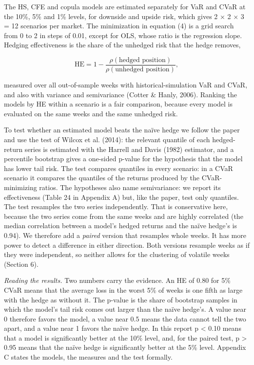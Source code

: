\documentclass[11pt,letterpaper]{article}
\begin{document}
The HS, CFE and copula models are estimated separately for VaR and CVaR at the 10\%, 5\% and 1\% levels, for downside and upside risk, which gives 2 × 2 × 3 = 12 scenarios per market. The minimization in equation (4) is a grid search from 0 to 2 in steps of 0.01, except for OLS, whose ratio is the regression slope. Hedging effectiveness is the share of the unhedged risk that the hedge removes,

\begin{equation}
\mathrm{HE} = 1 - \frac{\rho(\text{hedged position})}{\rho(\text{unhedged position})},
\end{equation}

measured over all out-of-sample weeks with historical-simulation VaR and CVaR, and also with variance and semivariance (Cotter \& Hanly, 2006). Ranking the models by HE within a scenario is a fair comparison, because every model is evaluated on the same weeks and the same unhedged risk.

To test whether an estimated model beats the naïve hedge we follow the paper and use the test of Wilcox et al. (2014): the relevant quantile of each hedged-return series is estimated with the Harrell and Davis (1982) estimator, and a percentile bootstrap gives a one-sided p-value for the hypothesis that the model has lower tail risk. The test compares quantiles in every scenario: in a CVaR scenario it compares the quantiles of the returns produced by the CVaR-minimizing ratios. The hypotheses also name semivariance: we report its effectiveness (Table 24 in Appendix A) but, like the paper, test only quantiles. The test resamples the two series independently. That is conservative here, because the two series come from the same weeks and are highly correlated (the median correlation between a model's hedged returns and the naïve hedge's is 0.94). We therefore add a \textit{paired} version that resamples whole weeks. It has more power to detect a difference in either direction. Both versions resample weeks as if they were independent, so neither allows for the clustering of volatile weeks (Section 6).

\textit{Reading the results.} Two numbers carry the evidence. An HE of 0.80 for 5\% CVaR means that the average loss in the worst 5\% of weeks is one fifth as large with the hedge as without it. The p-value is the share of bootstrap samples in which the model's tail risk comes out larger than the naïve hedge's. A value near 0 therefore favors the model, a value near 0.5 means the data cannot tell the two apart, and a value near 1 favors the naïve hedge. In this report p < 0.10 means that a model is significantly better at the 10\% level, and, for the paired test, p > 0.95 means that the naïve hedge is significantly better at the 5\% level. Appendix C states the models, the measures and the test formally.
\end{document}
